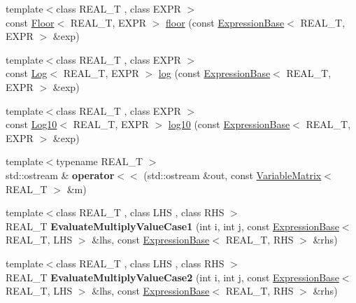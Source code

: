\begin{DoxyCompactItemize}
\item 
{\footnotesize template$<$class R\+E\+A\+L\+\_\+\+T , class E\+X\+P\+R $>$ }\\const \hyperlink{structatl_1_1_floor}{Floor}$<$ R\+E\+A\+L\+\_\+\+T, E\+X\+P\+R $>$ \hyperlink{namespaceatl_a47dbcb8c4b773328905f5c95f6d42b79}{floor} (const \hyperlink{structatl_1_1_expression_base}{Expression\+Base}$<$ R\+E\+A\+L\+\_\+\+T, E\+X\+P\+R $>$ \&exp)
\item 
{\footnotesize template$<$class R\+E\+A\+L\+\_\+\+T , class E\+X\+P\+R $>$ }\\const \hyperlink{structatl_1_1_log}{Log}$<$ R\+E\+A\+L\+\_\+\+T, E\+X\+P\+R $>$ \hyperlink{namespaceatl_a05496ef38c541404f043906f5c19a1ed}{log} (const \hyperlink{structatl_1_1_expression_base}{Expression\+Base}$<$ R\+E\+A\+L\+\_\+\+T, E\+X\+P\+R $>$ \&exp)
\item 
{\footnotesize template$<$class R\+E\+A\+L\+\_\+\+T , class E\+X\+P\+R $>$ }\\const \hyperlink{structatl_1_1_log10}{Log10}$<$ R\+E\+A\+L\+\_\+\+T, E\+X\+P\+R $>$ \hyperlink{namespaceatl_a0683db8646f2db62cac16810752ae70e}{log10} (const \hyperlink{structatl_1_1_expression_base}{Expression\+Base}$<$ R\+E\+A\+L\+\_\+\+T, E\+X\+P\+R $>$ \&exp)
\item 
\hypertarget{namespaceatl_a86495456a43f5c9b46512311b8945c29}{{\footnotesize template$<$typename R\+E\+A\+L\+\_\+\+T $>$ }\\std\+::ostream \& {\bfseries operator$<$$<$} (std\+::ostream \&out, const \hyperlink{structatl_1_1_variable_matrix}{Variable\+Matrix}$<$ R\+E\+A\+L\+\_\+\+T $>$ \&m)}\label{namespaceatl_a86495456a43f5c9b46512311b8945c29}

\item 
\hypertarget{namespaceatl_afbb4dbae00f36afdc8286ee17e2e4c3d}{{\footnotesize template$<$class R\+E\+A\+L\+\_\+\+T , class L\+H\+S , class R\+H\+S $>$ }\\R\+E\+A\+L\+\_\+\+T {\bfseries Evaluate\+Multiply\+Value\+Case1} (int i, int j, const \hyperlink{structatl_1_1_expression_base}{Expression\+Base}$<$ R\+E\+A\+L\+\_\+\+T, L\+H\+S $>$ \&lhs, const \hyperlink{structatl_1_1_expression_base}{Expression\+Base}$<$ R\+E\+A\+L\+\_\+\+T, R\+H\+S $>$ \&rhs)}\label{namespaceatl_afbb4dbae00f36afdc8286ee17e2e4c3d}

\item 
\hypertarget{namespaceatl_aa93672e899491a9c3cb7becef28a9c4e}{{\footnotesize template$<$class R\+E\+A\+L\+\_\+\+T , class L\+H\+S , class R\+H\+S $>$ }\\R\+E\+A\+L\+\_\+\+T {\bfseries Evaluate\+Multiply\+Value\+Case2} (int i, int j, const \hyperlink{structatl_1_1_expression_base}{Expression\+Base}$<$ R\+E\+A\+L\+\_\+\+T, L\+H\+S $>$ \&lhs, const \hyperlink{structatl_1_1_expression_base}{Expression\+Base}$<$ R\+E\+A\+L\+\_\+\+T, R\+H\+S $>$ \&rhs)}\label{namespaceatl_aa93672e899491a9c3cb7becef28a9c4e}


\end{DoxyCompactItemize}
